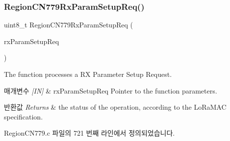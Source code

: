 \subsubsection{\texorpdfstring{Region\+C\+N779\+Rx\+Param\+Setup\+Req()}{RegionCN779RxParamSetupReq()}}
{\footnotesize\ttfamily uint8\+\_\+t Region\+C\+N779\+Rx\+Param\+Setup\+Req (\begin{DoxyParamCaption}\item[{\mbox{\hyperlink{group___r_e_g_i_o_n_ga7165f282c670c728c36d534df2285157}{Rx\+Param\+Setup\+Req\+Params\+\_\+t}} $\ast$}]{rx\+Param\+Setup\+Req }\end{DoxyParamCaption})}



The function processes a RX Parameter Setup Request. 


\begin{DoxyParams}{매개변수}
{\em \mbox{[}\+I\+N\mbox{]}} & rx\+Param\+Setup\+Req Pointer to the function parameters.\\
\hline
\end{DoxyParams}

\begin{DoxyRetVals}{반환값}
{\em Returns} & the status of the operation, according to the Lo\+Ra\+M\+AC specification. \\
\hline
\end{DoxyRetVals}


Region\+C\+N779.\+c 파일의 721 번째 라인에서 정의되었습니다.



